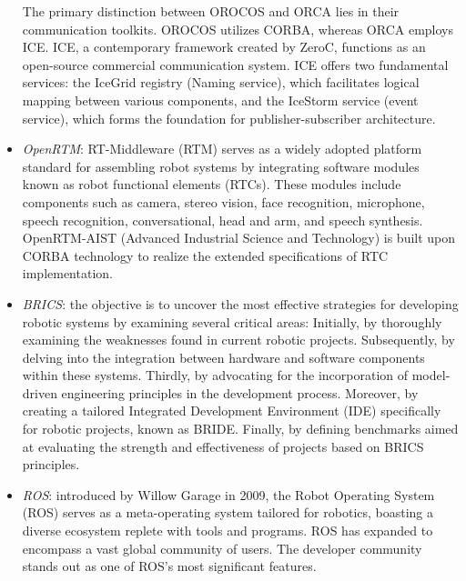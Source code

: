 \begin{itemize}
        The primary distinction between OROCOS and ORCA lies in their communication toolkits. 
        OROCOS utilizes CORBA, whereas ORCA employs ICE. 
        ICE, a contemporary framework created by ZeroC, functions as an open-source commercial communication system. 
        ICE offers two fundamental services: the IceGrid registry (Naming service), which facilitates logical mapping between various components, and the IceStorm service (event service), which forms the foundation for publisher-subscriber architecture.
    \item \textit{OpenRTM}: RT-Middleware (RTM) serves as a widely adopted platform standard for assembling robot systems by integrating software modules known as robot functional elements (RTCs). 
        These modules include components such as camera, stereo vision, face recognition, microphone, speech recognition, conversational, head and arm, and speech synthesis. 
        OpenRTM-AIST (Advanced Industrial Science and Technology) is built upon CORBA technology to realize the extended specifications of RTC implementation.
    \item \textit{BRICS}: the objective is to uncover the most effective strategies for developing robotic systems by examining several critical areas:
        Initially, by thoroughly examining the weaknesses found in current robotic projects.    
        Subsequently, by delving into the integration between hardware and software components within these systems.    
        Thirdly, by advocating for the incorporation of model-driven engineering principles in the development process.    
        Moreover, by creating a tailored Integrated Development Environment (IDE) specifically for robotic projects, known as BRIDE.    
        Finally, by defining benchmarks aimed at evaluating the strength and effectiveness of projects based on BRICS principles.
    \item \textit{ROS}: introduced by Willow Garage in 2009, the Robot Operating System (ROS) serves as a meta-operating system tailored for robotics, boasting a diverse ecosystem replete with tools and programs.
        ROS has expanded to encompass a vast global community of users. 
        The developer community stands out as one of ROS's most significant features.
\end{itemize}  